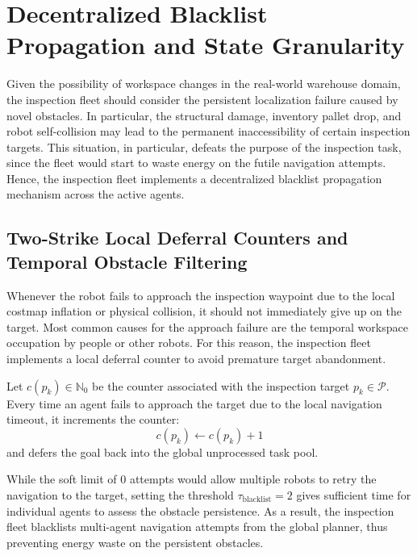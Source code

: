 \section{Decentralized Blacklist Propagation and State Granularity}

Given the possibility of workspace changes in the real-world warehouse domain, the inspection fleet should consider the persistent localization failure caused by novel obstacles. In particular, the structural damage, inventory pallet drop, and robot self-collision may lead to the permanent inaccessibility of certain inspection targets. This situation, in particular, defeats the purpose of the inspection task, since the fleet would start to waste energy on the futile navigation attempts. Hence, the inspection fleet implements a decentralized blacklist propagation mechanism across the active agents.

\subsection{Two-Strike Local Deferral Counters and Temporal Obstacle Filtering}\label{sec:ch6_two_strike}

Whenever the robot fails to approach the inspection waypoint due to the local costmap inflation or physical collision, it should not immediately give up on the target. Most common causes for the approach failure are the temporal workspace occupation by people or other robots. For this reason, the inspection fleet implements a local deferral counter to avoid premature target abandonment.

Let $c(p_k) \in \mathbb{N}_0$ be the counter associated with the inspection target $p_k \in \mathcal{P}$. Every time an agent fails to approach the target due to the local navigation timeout, it increments the counter:
\begin{equation} c(p_k) \leftarrow c(p_k) + 1 \label{eq:deferral_counter_increment} \end{equation}
and defers the goal back into the global unprocessed task pool.

While the soft limit of 0 attempts would allow multiple robots to retry the navigation to the target, setting the threshold $\tau_{\text{blacklist}} = 2$ gives sufficient time for individual agents to assess the obstacle persistence. As a result, the inspection fleet blacklists multi-agent navigation attempts from the global planner, thus preventing energy waste on the persistent obstacles.

